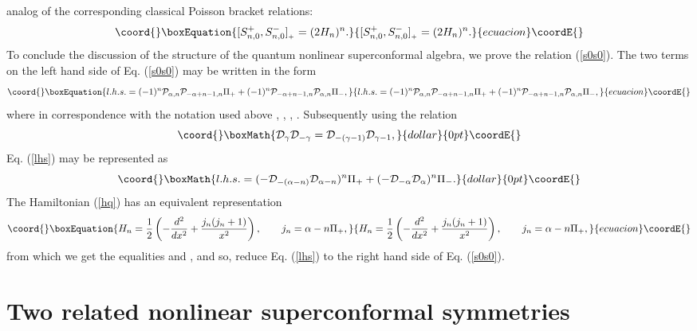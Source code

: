 \documentclass[a4paper,12pt]{article}
\begin{document}
analog of the
corresponding
classical Poisson bracket relations:
\begin{equation}\coord{}\boxEquation{
[S^+_{n,0},S^-_{n,0}]_{{}_+}=(2H_n)^n.
\label{s0s0}
}{
[S^+_{n,0},S^-_{n,0}]_{{}_+}=(2H_n)^n.
}{ecuacion}\coordE{}\end{equation}
To conclude the discussion of the structure
of the quantum nonlinear superconformal algebra,
we prove the relation (\ref{s0s0}).
The two terms on the left hand side of Eq.
(\ref{s0s0}) may be written in the form
\begin{equation}\coord{}\boxEquation{
l.h.s.= (-1)^n{\cal P}_{\alpha,n}{\cal P}_{-\alpha +n-1,n}
\Pi_+
+(-1)^n{\cal P}_{-\alpha+n-1,n}{\cal P}_{\alpha,n}\Pi_-,
\label{lhs}
}{
l.h.s.= (-1)^n{\cal P}_{\alpha,n}{\cal P}_{-\alpha +n-1,n}
\Pi_+
+(-1)^n{\cal P}_{-\alpha+n-1,n}{\cal P}_{\alpha,n}\Pi_-,
}{ecuacion}\coordE{}\end{equation}
where in correspondence with the notation used above
\coordHE{}, \coordHE{},
\coordHE{},
\coordHE{}.
Subsequently using the relation
$$\coord{}\boxMath{
{\cal D}_\gamma{\cal D}_{-\gamma}=
{\cal D}_{-(\gamma-1)}{\cal D}_{\gamma-1},
}{dollar}{0pt}\coordE{}$$
Eq. (\ref{lhs}) may be represented as
$$\coord{}\boxMath{
l.h.s.=(-{\cal D}_{-(\alpha-n)}{\cal D}_{\alpha -n})^n\Pi_+
+(-{\cal D}_{-\alpha}{\cal D}_{\alpha})^n\Pi_-.
}{dollar}{0pt}\coordE{}$$
The Hamiltonian (\ref{hq}) has an equivalent representation
\begin{equation}\coord{}\boxEquation{
H_n=\frac{1}{2}\left(-\frac{d^2}{dx^2}+\frac{j_n(j_n+1)}{x^2
}\right),
\qquad j_n=\alpha -n\Pi_+,
\label{hj}
}{
H_n=\frac{1}{2}\left(-\frac{d^2}{dx^2}+\frac{j_n(j_n+1)}{x^2
}\right),
\qquad j_n=\alpha -n\Pi_+,
}{ecuacion}\coordE{}\end{equation}
from which we get the equalities
\coordHE{}
and
\coordHE{},
and so, reduce Eq. (\ref{lhs}) to the right hand side of
Eq. (\ref{s0s0}).




\section{Two related nonlinear superconformal symmetries}
\end{document}
